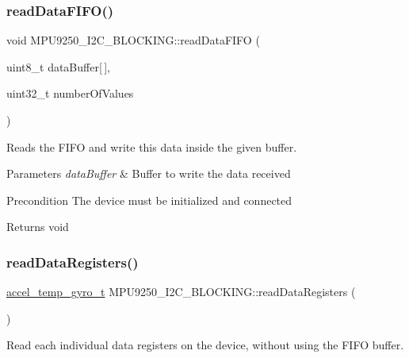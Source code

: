 \subsubsection{\texorpdfstring{read\+Data\+F\+I\+F\+O()}{readDataFIFO()}}
{\footnotesize\ttfamily void M\+P\+U9250\+\_\+\+I2\+C\+\_\+\+B\+L\+O\+C\+K\+I\+N\+G\+::read\+Data\+F\+I\+FO (\begin{DoxyParamCaption}\item[{uint8\+\_\+t}]{data\+Buffer\mbox{[}$\,$\mbox{]},  }\item[{uint32\+\_\+t}]{number\+Of\+Values }\end{DoxyParamCaption})}



Reads the F\+I\+FO and write this data inside the given buffer. 


\begin{DoxyParams}{Parameters}
{\em data\+Buffer} & Buffer to write the data received \\
\hline
\end{DoxyParams}
\begin{DoxyPrecond}{Precondition}
The device must be initialized and connected 
\end{DoxyPrecond}
\begin{DoxyReturn}{Returns}
void 
\end{DoxyReturn}
\mbox{\label{class_m_p_u9250___i2_c___b_l_o_c_k_i_n_g_a8622a72cd6910d10938f30d1003e39d2}} 
\subsubsection{\texorpdfstring{read\+Data\+Registers()}{readDataRegisters()}}
{\footnotesize\ttfamily \hyperlink{unionaccel__temp__gyro__t}{accel\+\_\+temp\+\_\+gyro\+\_\+t} M\+P\+U9250\+\_\+\+I2\+C\+\_\+\+B\+L\+O\+C\+K\+I\+N\+G\+::read\+Data\+Registers (\begin{DoxyParamCaption}{ }\end{DoxyParamCaption})}



Read each individual data registers on the device, without using the F\+I\+FO buffer. 



